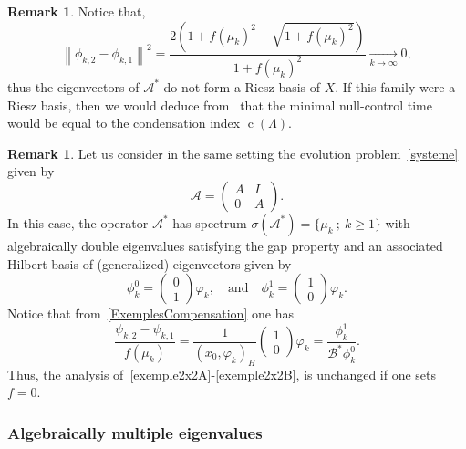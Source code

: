 \documentclass[11pt]{article}
\theoremstyle{definition}
\newtheorem{rema}[theo]{Remark}
\numberwithin{equation}{section}
\numberwithin{figure}{section}
\numberwithin{table}{section}
\newcommand\A{\mathcal{A}}
\newcommand\As{\mathcal{A}^*}
\newcommand\Bs{\mathcal{B}^*}
\newcommand{\normeX}[1]{\left\| #1 \right\|}
\newcommand{\psH}[2]{\left(#1, #2 \right)_H}
\DeclareMathOperator{\cond}{c}
\begin{document}
\begin{rema}
Notice that,
\begin{equation*}\label{ExAcademique1:EstimeeDifferenceVectProp}
\normeX{ \phi_{k,2} - \phi_{k,1} }^2 = \frac{2 \left(1+ f(\mu_k)^2 - \sqrt{1+f(\mu_k)^2} \right)}{1+ f(\mu_k)^2} \underset{k \to \infty}{\longrightarrow} 0,
\end{equation*}
thus the eigenvectors of $\As$ do not form a Riesz basis of $X$. If this family were a Riesz basis, then we would deduce from~\cite{AmmarKhodjaBenabdallahGonzalez-BurgosdeTeresa:2014} that the minimal null-control time would be equal to the condensation index $\cond(\Lambda)$.
\end{rema}

\begin{rema} \label{Rem:SystLimite}
Let us consider in the same setting the evolution problem~\eqref{systeme} given by
\begin{equation*}\label{exempleA}
\A=
\begin{pmatrix} A & I \\ 0 & A
\end{pmatrix}.
\end{equation*}
In this case, the operator $\As$ has spectrum $ \sigma(\As)=\{ \mu_k \: ; \: k \geq 1\}$ with algebraically double eigenvalues satisfying the gap property and an associated Hilbert basis of (generalized) eigenvectors given by
\[
\phi_k^0=
\begin{pmatrix} 0 \\ 1
\end{pmatrix} \varphi_k,
\quad \text{and} \quad
\phi_k^1=
\begin{pmatrix} 1 \\ 0
\end{pmatrix} \varphi_k.
\]
Notice that from~\eqref{ExemplesCompensation} one has
\[
\frac{\psi_{k,2}- \psi_{k,1}}{f(\mu_k)} = \frac{1}{\psH{x_0}{\varphi_k}}
\begin{pmatrix} 1 \\ 0
\end{pmatrix} \varphi_k = \frac{\phi_k^1}{\Bs \phi_k^0}.
\]
Thus, the analysis of~\eqref{exemple2x2A}-\eqref{exemple2x2B}, is unchanged if one sets $f=0$.
\end{rema}



\subsubsection{Algebraically multiple eigenvalues}\label{secexample3x2+1}
\end{document}
